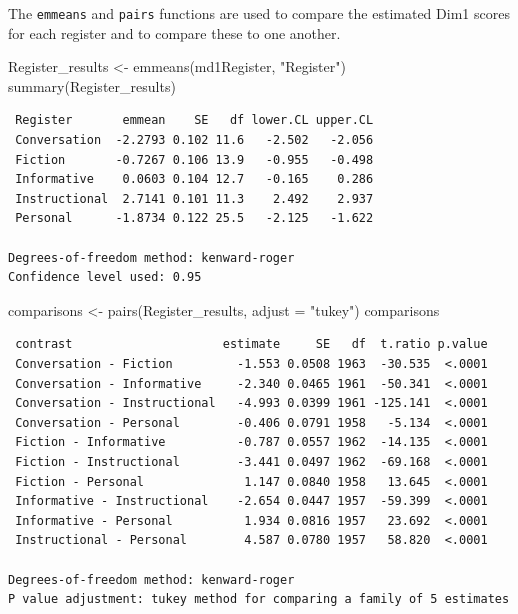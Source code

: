 \documentclass[
  letterpaper,
  DIV=11,
  numbers=noendperiod]{scrreprt}
\newenvironment{Shaded}{\begin{snugshade}}{\end{snugshade}}
\newcommand{\AttributeTok}[1]{\textcolor[rgb]{0.40,0.45,0.13}{#1}}
\newcommand{\FunctionTok}[1]{\textcolor[rgb]{0.28,0.35,0.67}{#1}}
\newcommand{\NormalTok}[1]{\textcolor[rgb]{0.00,0.23,0.31}{#1}}
\newcommand{\OtherTok}[1]{\textcolor[rgb]{0.00,0.23,0.31}{#1}}
\newcommand{\StringTok}[1]{\textcolor[rgb]{0.13,0.47,0.30}{#1}}
\begin{document}
The \texttt{emmeans} and \texttt{pairs} functions are used to compare
the estimated Dim1 scores for each register and to compare these to one
another.

\begin{Shaded}
\begin{Highlighting}[]
\NormalTok{Register\_results }\OtherTok{\textless{}{-}} \FunctionTok{emmeans}\NormalTok{(md1Register, }\StringTok{"Register"}\NormalTok{)}
\FunctionTok{summary}\NormalTok{(Register\_results)}
\end{Highlighting}
\end{Shaded}

\begin{verbatim}
 Register       emmean    SE   df lower.CL upper.CL
 Conversation  -2.2793 0.102 11.6   -2.502   -2.056
 Fiction       -0.7267 0.106 13.9   -0.955   -0.498
 Informative    0.0603 0.104 12.7   -0.165    0.286
 Instructional  2.7141 0.101 11.3    2.492    2.937
 Personal      -1.8734 0.122 25.5   -2.125   -1.622

Degrees-of-freedom method: kenward-roger 
Confidence level used: 0.95 
\end{verbatim}

\begin{Shaded}
\begin{Highlighting}[]
\NormalTok{comparisons }\OtherTok{\textless{}{-}} \FunctionTok{pairs}\NormalTok{(Register\_results, }\AttributeTok{adjust =} \StringTok{"tukey"}\NormalTok{)}
\NormalTok{comparisons}
\end{Highlighting}
\end{Shaded}

\begin{verbatim}
 contrast                     estimate     SE   df  t.ratio p.value
 Conversation - Fiction         -1.553 0.0508 1963  -30.535  <.0001
 Conversation - Informative     -2.340 0.0465 1961  -50.341  <.0001
 Conversation - Instructional   -4.993 0.0399 1961 -125.141  <.0001
 Conversation - Personal        -0.406 0.0791 1958   -5.134  <.0001
 Fiction - Informative          -0.787 0.0557 1962  -14.135  <.0001
 Fiction - Instructional        -3.441 0.0497 1962  -69.168  <.0001
 Fiction - Personal              1.147 0.0840 1958   13.645  <.0001
 Informative - Instructional    -2.654 0.0447 1957  -59.399  <.0001
 Informative - Personal          1.934 0.0816 1957   23.692  <.0001
 Instructional - Personal        4.587 0.0780 1957   58.820  <.0001

Degrees-of-freedom method: kenward-roger 
P value adjustment: tukey method for comparing a family of 5 estimates 
\end{verbatim}
\end{document}
